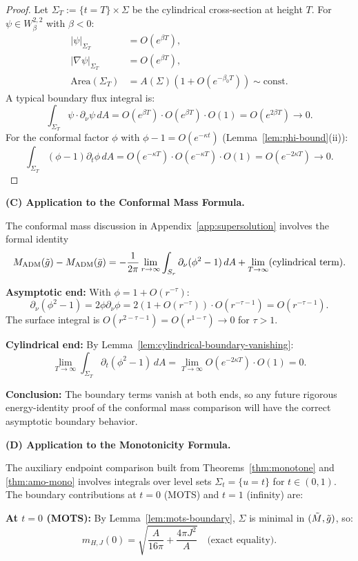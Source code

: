 \begin{proof}
Let $\Sigma_T := \{t = T\} \times \Sigma$ be the cylindrical cross-section at height $T$. For $\psi \in W^{2,2}_\beta$ with $\beta < 0$:
\begin{align*}
|\psi|_{\Sigma_T} &= O(e^{\beta T}), \\
|\nabla\psi|_{\Sigma_T} &= O(e^{\beta T}), \\
\text{Area}(\Sigma_T) &= A(\Sigma)(1 + O(e^{-\beta_0 T})) \sim \text{const}.
\end{align*}
A typical boundary flux integral is:
\[
\int_{\Sigma_T} \psi \cdot \partial_\nu\psi \, dA = O(e^{\beta T}) \cdot O(e^{\beta T}) \cdot O(1) = O(e^{2\beta T}) \to 0.
\]
For the conformal factor $\phi$ with $\phi - 1 = O(e^{-\kappa t})$ (Lemma~\ref{lem:phi-bound}(ii)):
\[
\int_{\Sigma_T} (\phi - 1) \partial_t\phi \, dA = O(e^{-\kappa T}) \cdot O(e^{-\kappa T}) \cdot O(1) = O(e^{-2\kappa T}) \to 0.
\]
\end{proof}

\textbf{(C) Application to the Conformal Mass Formula.}

The conformal mass discussion in Appendix~\ref{app:supersolution} involves the formal identity
\[
M_{\mathrm{ADM}}(\tilde{g}) - M_{\mathrm{ADM}}(\bar{g}) = -\frac{1}{2\pi}\lim_{r \to \infty} \int_{S_r} \partial_\nu(\phi^2 - 1) \, dA + \lim_{T \to \infty}(\text{cylindrical term}).
\]

\textbf{Asymptotic end:} With $\phi = 1 + O(r^{-\tau})$:
\[
\partial_\nu(\phi^2 - 1) = 2\phi\partial_\nu\phi = 2(1 + O(r^{-\tau})) \cdot O(r^{-\tau-1}) = O(r^{-\tau-1}).
\]
The surface integral is $O(r^{2-\tau-1}) = O(r^{1-\tau}) \to 0$ for $\tau > 1$.

\textbf{Cylindrical end:} By Lemma~\ref{lem:cylindrical-boundary-vanishing}:
\[
\lim_{T \to \infty} \int_{\Sigma_T} \partial_t(\phi^2 - 1) \, dA = \lim_{T \to \infty} O(e^{-2\kappa T}) \cdot O(1) = 0.
\]

\textbf{Conclusion:} The boundary terms vanish at both ends, so any future rigorous energy-identity proof of the conformal mass comparison will have the correct asymptotic boundary behavior.

\textbf{(D) Application to the Monotonicity Formula.}

The auxiliary endpoint comparison built from Theorems~\ref{thm:monotone} and \ref{thm:amo-mono} involves integrals over level sets $\Sigma_t = \{u = t\}$ for $t \in (0,1)$. The boundary contributions at $t = 0$ (MOTS) and $t = 1$ (infinity) are:

\textbf{At $t = 0$ (MOTS):} By Lemma~\ref{lem:mots-boundary}, $\Sigma$ is minimal in $(\tilde{M}, \tilde{g})$, so:
\[
m_{H,J}(0) = \sqrt{\frac{A}{16\pi} + \frac{4\pi J^2}{A}} \quad \text{(exact equality)}.
\]

